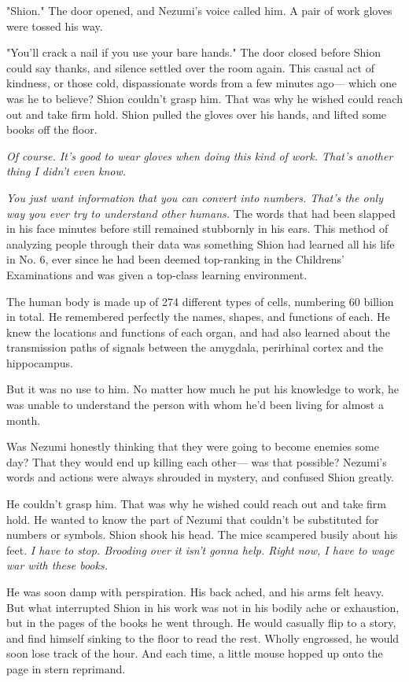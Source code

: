 "Shion." The door opened, and Nezumi's voice called him. A pair of work
gloves were tossed his way.

"You'll crack a nail if you use your bare hands." The door closed before
Shion could say thanks, and silence settled over the room again. This
casual act of kindness, or those cold, dispassionate words from a few
minutes ago--- which one was he to believe? Shion couldn't grasp him. That
was why he wished could reach out and take firm hold. Shion pulled the
gloves over his hands, and lifted some books off the floor.

\emph{Of course. It's good to wear gloves when doing this kind of work. That's
another thing I didn't even know.}

\emph{You just want information that you can convert into numbers. That's the
only way you ever try to understand other humans.} The words that had
been slapped in his face minutes before still remained stubbornly in his
ears. This method of analyzing people through their data was something
Shion had learned all his life in No. 6, ever since he had been deemed
top-ranking in the Childrens' Examinations and was given a top-class
learning environment.

The human body is made up of 274 different types of cells, numbering 60
billion in total. He remembered perfectly the names, shapes, and
functions of each. He knew the locations and functions of each organ,
and had also learned about the transmission paths of signals between the
amygdala, perirhinal cortex and the hippocampus.

But it was no use to him. No matter how much he put his knowledge to
work, he was unable to understand the person with whom he'd been living
for almost a month.

Was Nezumi honestly thinking that they were going to become enemies some
day? That they would end up killing each other--- was that possible?
Nezumi's words and actions were always shrouded in mystery, and confused
Shion greatly.

He couldn't grasp him. That was why he wished could reach out and take
firm hold. He wanted to know the part of Nezumi that couldn't be
substituted for numbers or symbols. Shion shook his head. The mice
scampered busily about his feet. \emph{I have to stop. Brooding over it isn't
gonna help. Right now, I have to wage war with these books.}

He was soon damp with perspiration. His back ached, and his arms felt
heavy. But what interrupted Shion in his work was not in his bodily ache
or exhaustion, but in the pages of the books he went through. He would
casually flip to a story, and find himself sinking to the floor to read
the rest. Wholly engrossed, he would soon lose track of the hour. And
each time, a little mouse hopped up onto the page in stern reprimand.

